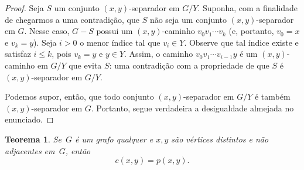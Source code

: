 \documentclass[12pt, a4paper]{article}
\newtheorem{teor}{Teorema}[section]
\theoremstyle{definition}
\begin{document}
\begin{proof}
  Seja $S$ um conjunto $(x,y)$-separador em $G/Y$. Suponha, com a finalidade de chegarmos a uma contradição, que $S$ não seja um conjunto $(x,y)$-separador em $G$. Nesse caso, $G - S$ possui um $(x,y)$-caminho $v_0 v_1 \cdots v_k$ (e, portanto, $v_0 = x$ e $v_k = y$). Seja $i > 0$ o menor índice tal que $v_i \in Y$. Observe que tal índice existe e satisfaz $i \leq k$, pois $v_k = y$ e $y \in Y$. Assim, o caminho $v_0 v_1 \cdots v_{i-1} y$ é um $(x,y)$-caminho em $G/Y$ que evita $S$: uma contradição com a propriedade de que $S$ é $(x,y)$-separador em $G/Y$. 

Podemos supor, então, que todo conjunto $(x,y)$-separador em $G/Y$ é também $(x,y)$-separador em $G$. Portanto, segue verdadeira a desigualdade almejada no enunciado.
\end{proof}


\begin{teor}
\label{teor:menger}
Se~$G$ é um grafo qualquer e $x,y$ são vértices distintos e não adjacentes em~$G$, então
\begin{equation}
  \label{eq:min_max_conn2}
  c(x,y) = p(x,y).
\end{equation}
\end{teor}
\end{document}

